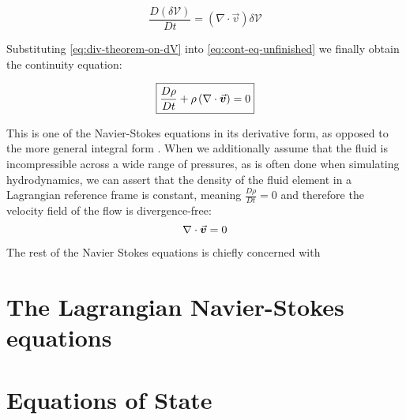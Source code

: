 \begin{equation}\label{eq:div-theorem-on-dV}
  \frac{D(\delta \mathcal{V})}{D t} = \left( \nabla\cdot \vec{v}\right) \delta \mathcal{V}
\end{equation}

Substituting \autoref{eq:div-theorem-on-dV} into \autoref{eq:cont-eq-unfinished} we finally obtain the continuity equation:

\begin{equation}
  \text{\fbox{$\frac{D\rho}{D t} + \rho\left( \nabla \cdot \vec{\bm{v}} \right) = 0$}}
\end{equation}

This is one of the Navier-Stokes equations in its derivative form, as opposed to the more general integral form \autocite*{anderson}. When we additionally assume that the fluid is incompressible across a wide range of pressures, as is often done when simulating hydrodynamics, we can assert that the density of the fluid element in a Lagrangian reference frame is constant, meaning $\frac{D\rho}{D t} = 0$ and therefore the velocity field of the flow is divergence-free\autocite*{continuum-intro}:
\begin{equation}
  \nabla\cdot \vec{\bm{v}} = 0
\end{equation}


\horizontalspacer

The rest of the Navier Stokes equations is chiefly concerned with


\newpage
\section{The Lagrangian Navier-Stokes equations}
\section{Equations of State}